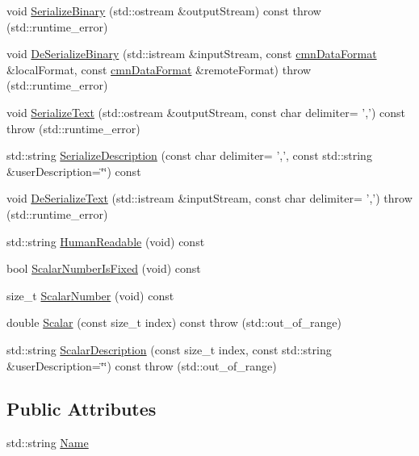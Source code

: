 \begin{DoxyCompactItemize}
\item 
void \hyperlink{classmts_event_void_description_a11a77a67506f67206ce0b47cbde2fcc3}{Serialize\-Binary} (std\-::ostream \&output\-Stream) const   throw (std\-::runtime\-\_\-error)
\item 
void \hyperlink{classmts_event_void_description_a2c859441a0af6bf0aa0ba6bbe1d7c87a}{De\-Serialize\-Binary} (std\-::istream \&input\-Stream, const \hyperlink{classcmn_data_format}{cmn\-Data\-Format} \&local\-Format, const \hyperlink{classcmn_data_format}{cmn\-Data\-Format} \&remote\-Format)  throw (std\-::runtime\-\_\-error)
\item 
void \hyperlink{classmts_event_void_description_a591922a4faf39f487b88f6b29a3c1fc7}{Serialize\-Text} (std\-::ostream \&output\-Stream, const char delimiter= ',') const   throw (std\-::runtime\-\_\-error)
\item 
std\-::string \hyperlink{classmts_event_void_description_a6f677ff672e7082fc3e7d37361abab95}{Serialize\-Description} (const char delimiter= ',', const std\-::string \&user\-Description=\char`\"{}\char`\"{}) const 
\item 
void \hyperlink{classmts_event_void_description_a5fbe1024ae9a679d17ab3eb567a66ec2}{De\-Serialize\-Text} (std\-::istream \&input\-Stream, const char delimiter= ',')  throw (std\-::runtime\-\_\-error)
\item 
std\-::string \hyperlink{classmts_event_void_description_a346e83ffdc9347855bb3728844c127c7}{Human\-Readable} (void) const 
\item 
bool \hyperlink{classmts_event_void_description_ade9dd6a1b11316e28048ee9caceb89c0}{Scalar\-Number\-Is\-Fixed} (void) const 
\item 
size\-\_\-t \hyperlink{classmts_event_void_description_a88e0e5ecbf8692f9daa0b610fad4491b}{Scalar\-Number} (void) const 
\item 
double \hyperlink{classmts_event_void_description_a12117fc7d86985a158e3fc79989d91ee}{Scalar} (const size\-\_\-t index) const   throw (std\-::out\-\_\-of\-\_\-range)
\item 
std\-::string \hyperlink{classmts_event_void_description_abf0d7eac9b56cf9815f89bbf1179b135}{Scalar\-Description} (const size\-\_\-t index, const std\-::string \&user\-Description=\char`\"{}\char`\"{}) const   throw (std\-::out\-\_\-of\-\_\-range)
\end{DoxyCompactItemize}
\subsection*{Public Attributes}
\begin{DoxyCompactItemize}
\item 
std\-::string \hyperlink{classmts_event_void_description_a9738223fff7b80a3152e1acd0bc1a343}{Name}
\end{DoxyCompactItemize}


